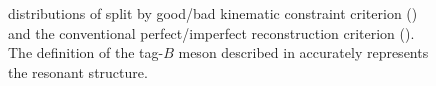 \begin{figure}[hbtp!]
    \centering
    \caption{\label{fig:good_tag_definitions} \Mbc distributions of \BtoXsgamma split by good/bad kinematic constraint criterion ()
    and the conventional perfect/imperfect reconstruction criterion ().
    The definition of the tag-$B$ meson described in 
    accurately represents the resonant \Mbc structure.
    }
\end{figure}